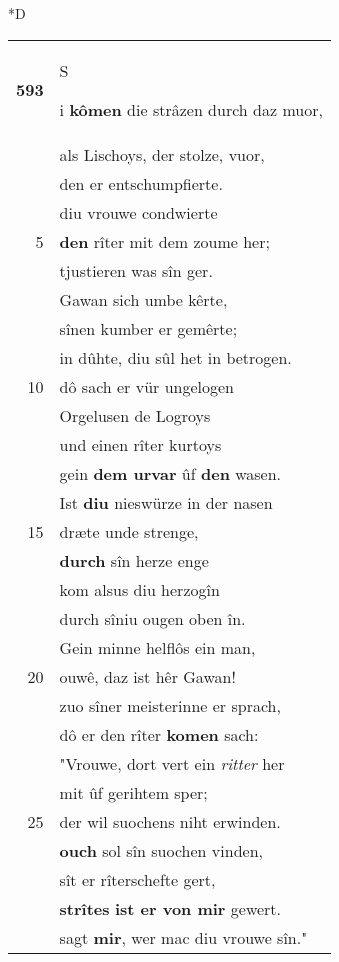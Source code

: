 \documentclass[8pt,a4paper,notitlepage]{article}
\begin{document}
\begin{table}[ht]
\begin{minipage}[t]{0.5\linewidth}
\small
\begin{center}*D
\end{center}
\begin{tabular}{rl}
\textbf{593} & \begin{large}S\end{large}i \textbf{kômen} die strâzen durch daz muor,\\ 
 & als Lischoys, der stolze, vuor,\\ 
 & den er entschumpfierte.\\ 
 & diu vrouwe condwierte\\ 
5 & \textbf{den} rîter mit dem zoume her;\\ 
 & tjustieren was sîn ger.\\ 
 & Gawan sich umbe kêrte,\\ 
 & sînen kumber er gemêrte;\\ 
 & in dûhte, diu sûl het in betrogen.\\ 
10 & dô sach er vür ungelogen\\ 
 & Orgelusen de Logroys\\ 
 & und einen rîter kurtoys\\ 
 & gein \textbf{dem urvar} ûf \textbf{den} wasen.\\ 
 & Ist \textbf{diu} nieswürze in der nasen\\ 
15 & dræte unde strenge,\\ 
 & \textbf{durch} sîn herze enge\\ 
 & kom alsus diu herzogîn\\ 
 & durch sîniu ougen oben în.\\ 
 & Gein minne helflôs ein man,\\ 
20 & ouwê, daz ist hêr Gawan!\\ 
 & zuo sîner meisterinne er sprach,\\ 
 & dô er den rîter \textbf{komen} sach:\\ 
 & "Vrouwe, dort vert ein \textit{ritter} her\\ 
 & mit ûf gerihtem sper;\\ 
25 & der wil suochens niht erwinden.\\ 
 & \textbf{ouch} sol sîn suochen vinden,\\ 
 & sît er rîterschefte gert,\\ 
 & \textbf{strîtes} \textbf{ist er von mir} gewert.\\ 
 & sagt \textbf{mir}, wer mac diu vrouwe sîn."\\ 

\end{tabular}
\end{minipage}
\end{table}
\end{document}
